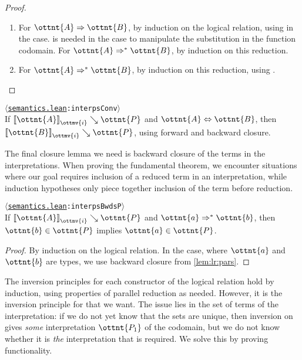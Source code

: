 \documentclass[a4paper,UKenglish,cleveref,autoref,thm-restate]{lipics-v2021}
\newcommand{\repo}{https://github.com/ionathanch/TTBFL}
\newcommand{\thmref}[2]{%
  $\langle$\href{\repo/tree/main/src/#1}{\texttt{#1}}\texttt{:#2}$\rangle$%
}
\begin{document}
\begin{proof} ~
  \begin{enumerate}[topsep=0pt]
    \item For $ \ottnt{A}  \Rightarrow  \ottnt{B} $, by induction on the logical relation,
      using  in the  case.
       is needed in the  case
      to manipulate the substitution in the function codomain.
      For $ \ottnt{A}  \Rightarrow^\ast  \ottnt{B} $, by induction on this reduction.
    \item For $ \ottnt{A}  \Rightarrow^\ast  \ottnt{B} $, by induction on this reduction,
      using . \qedhere
  \end{enumerate}
\end{proof}

\begin{corollary}[Conversion (l.r.)] \thmref{semantics.lean}{interpsConv} \\
  If $ \mathopen{\llbracket}  \ottnt{A}  \mathclose{\rrbracket}_{ \ottmv{i} } \searrow  \ottnt{P} $ and $ \ottnt{A}  \Leftrightarrow  \ottnt{B} $,
  then $ \mathopen{\llbracket}  \ottnt{B}  \mathclose{\rrbracket}_{ \ottmv{i} } \searrow  \ottnt{P} $,
  using forward and backward closure.
\end{corollary}

The final closure lemma we need is backward closure of the terms in the interpretations.
When proving the fundamental theorem,
we encounter situations where our goal requires inclusion of a reduced term in an interpretation,
while induction hypotheses only piece together inclusion of the term before reduction.

\begin{lemma} \thmref{semantics.lean}{interpsBwdsP} \label{lem:lr:back} \\
  If $ \mathopen{\llbracket}  \ottnt{A}  \mathclose{\rrbracket}_{ \ottmv{i} } \searrow  \ottnt{P} $ and $ \ottnt{a}  \Rightarrow^\ast  \ottnt{b} $,
  then $ \ottnt{b}  \in  \ottnt{P} $ implies $ \ottnt{a}  \in  \ottnt{P} $.
\end{lemma}

\begin{proof}
  By induction on the logical relation.
  In the  case, where $\ottnt{a}$ and $\ottnt{b}$ are types,
  we use backward closure from \cref{lem:lr:pars}.
\end{proof}

The inversion principles for each constructor of the logical relation
hold by induction, using properties of parallel reduction as needed.
However, it is the inversion principle for  that we want.
The issue lies in the set of terms of the interpretation:
if we do not yet know that the sets are unique,
then inversion on  gives \emph{some} interpretation $\ottnt{P_{{\mathrm{1}}}}$ of the codomain,
but we do not know whether it is \emph{the} interpretation that is required.
We solve this by proving functionality.
\end{document}
